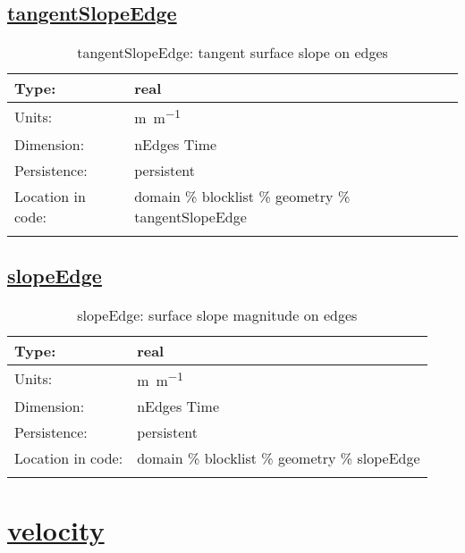 \subsection[tangentSlopeEdge]{\hyperref[sec:var_tab_geometry]{tangentSlopeEdge}}
\label{subsec:var_sec_geometry_tangentSlopeEdge}
\begin{center}
\begin{longtable}{| p{2.0in} | p{4.0in} |}
        \hline 
        Type: & real \\
        \hline 
        Units: & \si{m.m^{-1}} \\
        \hline 
        Dimension: & nEdges Time \\
        \hline 
        Persistence: & persistent \\
        \hline 
         Location in code: & domain \% blocklist \% geometry \% tangentSlopeEdge \\
         \hline 
    \caption{tangentSlopeEdge: tangent surface slope on edges}
\end{longtable}
\end{center}
\subsection[slopeEdge]{\hyperref[sec:var_tab_geometry]{slopeEdge}}
\label{subsec:var_sec_geometry_slopeEdge}
\begin{center}
\begin{longtable}{| p{2.0in} | p{4.0in} |}
        \hline 
        Type: & real \\
        \hline 
        Units: & \si{m.m^{-1}} \\
        \hline 
        Dimension: & nEdges Time \\
        \hline 
        Persistence: & persistent \\
        \hline 
         Location in code: & domain \% blocklist \% geometry \% slopeEdge \\
         \hline 
    \caption{slopeEdge: surface slope magnitude on edges}
\end{longtable}
\end{center}
\section[velocity]{\hyperref[sec:var_tab_velocity]{velocity}}
\label{sec:var_sec_velocity}
